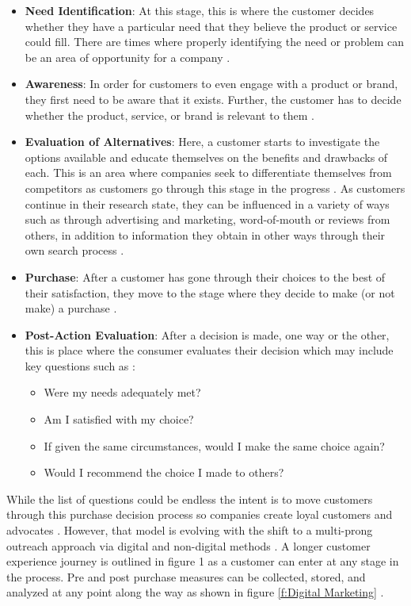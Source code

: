 \documentclass[sigconf]{acmart}
\begin{document}
\begin{itemize}
    \item \textbf{Need Identification}: At this stage, this is where the customer decides whether they have a particular need that they believe the product or service could fill. There are times where properly identifying the need or problem can be an area of opportunity for a company \cite{DeAsi2017}. 
  \item \textbf{Awareness}: In order for customers to even engage with a product or brand, they first need to be aware that it exists. Further, the customer has to decide whether the product, service, or brand is relevant to them \cite{DeAsi2017}.
  \item \textbf{Evaluation of Alternatives}: Here, a customer starts to investigate the options available and educate themselves on the benefits and drawbacks of each. This is an area where companies seek to differentiate themselves from competitors as customers go through this stage in the progress \cite{DeAsi2017}. As customers continue in their research state, they can be influenced in a variety of ways such as through advertising and marketing, word-of-mouth or reviews from others, in addition to information they obtain in other ways through their own search process \cite{Kannan2017}. 
   \item \textbf{Purchase}: After a customer has gone through their choices to the best of their satisfaction, they move to the stage where they decide to make (or not make) a purchase \cite{Kannan2017}. 
    \item \textbf{Post-Action Evaluation}: After a decision is made, one way or the other, this is place where the consumer evaluates their decision which may include key questions such as \cite{DeAsi2017}: 
    \begin{itemize}
    \item Were my needs adequately met? 
    \item Am I satisfied with my choice? 
    \item If given the same circumstances, would I make the same choice again?
    \item Would I recommend the choice I made to others?
     \end{itemize}
\end{itemize} 

While the list of questions could be endless the intent is to move customers through this purchase decision process so companies create loyal customers and advocates \cite{Kannan2017}. However, that model is evolving with the shift to a multi-prong outreach approach via digital and non-digital methods \cite{DeAsi2017}. A longer customer experience journey is outlined in figure 1 as a customer can enter at any stage in the process. Pre and post purchase measures can be collected, stored, and analyzed at any point along the way as shown in figure \ref{f:Digital Marketing} \cite{DeAsi2017}. 
\end{document}
